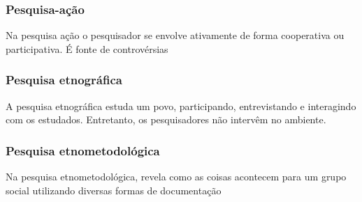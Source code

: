 \subsubsection{Pesquisa-ação}
Na pesquisa ação o pesquisador se envolve ativamente de forma cooperativa ou participativa. É fonte de controvérsias

\subsubsection{Pesquisa etnográfica}
A pesquisa etnográfica estuda um povo, participando, entrevistando e interagindo com os estudados. Entretanto, os pesquisadores não intervêm no ambiente.

\subsubsection{Pesquisa etnometodológica}
Na pesquisa etnometodológica, revela como as coisas acontecem para um grupo social utilizando diversas formas de documentação
